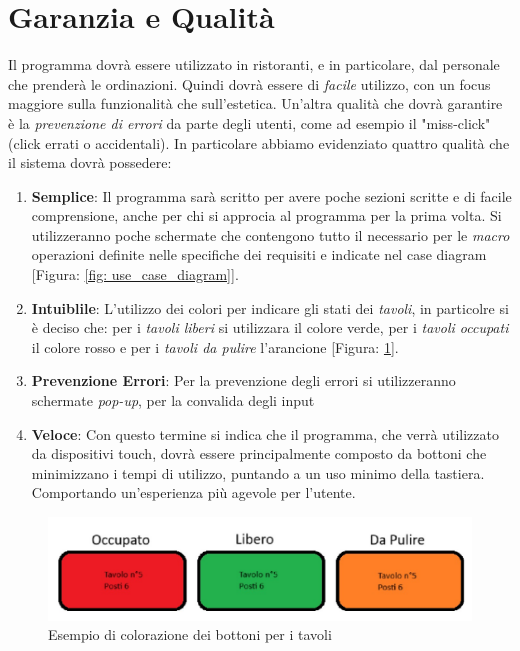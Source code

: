 \documentclass{book}
\begin{document}
\section{Garanzia e Qualità}

Il programma dovrà essere utilizzato in ristoranti, e in particolare, dal personale che prenderà le ordinazioni. Quindi dovrà essere di \textit{facile} utilizzo, con un focus maggiore sulla funzionalità che sull'estetica. Un'altra qualità che dovrà garantire è la \textit{prevenzione di errori} da parte degli utenti, come ad esempio il "miss-click" (click errati o accidentali).
In particolare abbiamo evidenziato quattro qualità che il sistema dovrà possedere:

\begin{enumerate}
    \item \textbf{Semplice}: Il programma sarà scritto per avere poche sezioni scritte e di facile comprensione, anche per chi si approcia al programma per la prima volta. Si utilizzeranno poche schermate che contengono tutto il necessario per le \textit{macro} operazioni definite nelle specifiche dei requisiti e indicate nel case diagram [Figura: \ref{fig: use_case_diagram}].
    \item \textbf{Intuiblile}: L'utilizzo dei colori per indicare gli stati dei \textit{tavoli}, in particolre si è deciso che: per i \textit{tavoli liberi} si utilizzara il colore verde, per i \textit{tavoli occupati} il colore rosso e per i \textit{tavoli da pulire} l'arancione [Figura: \ref{fig: es_bottoni}].
    \item \textbf{Prevenzione Errori}: Per la prevenzione degli errori si utilizzeranno schermate \textit{pop-up}, per la convalida degli input
    \item \textbf{Veloce}: Con questo termine si indica che il programma, che verrà utilizzato da dispositivi touch, dovrà essere principalmente composto da bottoni che minimizzano i tempi di utilizzo, puntando a un uso minimo della tastiera. Comportando un'esperienza più agevole per l'utente.
\end{enumerate}

\begin{figure}[h]
    \centering
    \includegraphics[width=0.6\linewidth]{Esempio_Bottoni.jpg}
    \caption{Esempio di colorazione dei bottoni per i tavoli}
    \label{fig: es_bottoni}
\end{figure}
\end{document}
